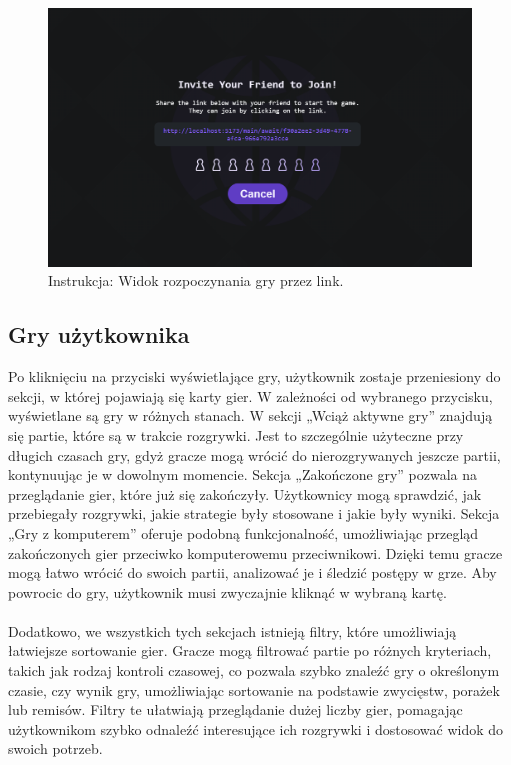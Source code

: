 \documentclass[twoside]{projektInzynierskiMS1}
\begin{document}
\vspace{0.5cm}
\begin{figure}[h!]
    \centering
    \includegraphics[width=1\textwidth]{images/ins_min_link.png}
    \caption{Instrukcja: Widok rozpoczynania gry przez link.}
\end{figure}

\newpage

\subsection{Gry użytkownika}

\noindent
Po kliknięciu na przyciski wyświetlające gry, użytkownik zostaje przeniesiony do sekcji, w której pojawiają się karty gier. W zależności od wybranego przycisku, wyświetlane są gry w różnych stanach. W sekcji „Wciąż aktywne gry” znajdują się partie, które są w trakcie rozgrywki. Jest to szczególnie użyteczne przy długich czasach gry, gdyż gracze mogą wrócić do nierozgrywanych jeszcze partii, kontynuując je w dowolnym momencie. Sekcja „Zakończone gry” pozwala na przeglądanie gier, które już się zakończyły. Użytkownicy mogą sprawdzić, jak przebiegały rozgrywki, jakie strategie były stosowane i jakie były wyniki. Sekcja „Gry z komputerem” oferuje podobną funkcjonalność, umożliwiając przegląd zakończonych gier przeciwko komputerowemu przeciwnikowi. Dzięki temu gracze mogą łatwo wrócić do swoich partii, analizować je i śledzić postępy w grze. Aby powrocic do gry, użytkownik musi zwyczajnie kliknąć w wybraną kartę.
\\\\
Dodatkowo, we wszystkich tych sekcjach istnieją filtry, które umożliwiają łatwiejsze sortowanie gier. Gracze mogą filtrować partie po różnych kryteriach, takich jak rodzaj kontroli czasowej, co pozwala szybko znaleźć gry o określonym czasie, czy wynik gry, umożliwiając sortowanie na podstawie zwycięstw, porażek lub remisów. Filtry te ułatwiają przeglądanie dużej liczby gier, pomagając użytkownikom szybko odnaleźć interesujące ich rozgrywki i dostosować widok do swoich potrzeb.
\end{document}

